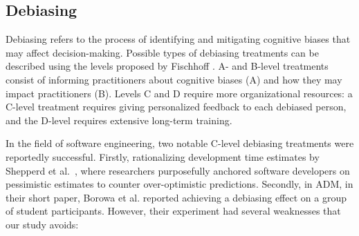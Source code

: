     \subsection{Debiasing} 
Debiasing refers to the process of identifying and mitigating cognitive biases that may affect decision-making.
    Possible types of debiasing treatments can be described using the levels proposed by Fischhoff \cite{fischhoff1982debiasing}. A- and B-level treatments consist of informing practitioners about cognitive biases (A) and how they may impact practitioners (B). Levels C and D require more organizational resources: a C-level treatment requires giving personalized feedback to each debiased person, and the D-level requires extensive long-term training.

    In the field of software engineering, two notable C-level debiasing treatments were reportedly successful. Firstly,  rationalizing development time estimates by Shepperd et al.~\cite{Shepperd2018}, where researchers purposefully anchored software developers on pessimistic estimates to counter over-optimistic predictions.     
    Secondly, in ADM, in their short paper, Borowa et al. \cite{Borowa2022} reported achieving a debiasing effect on a group of student participants. However, their experiment had several weaknesses that our study avoids:
